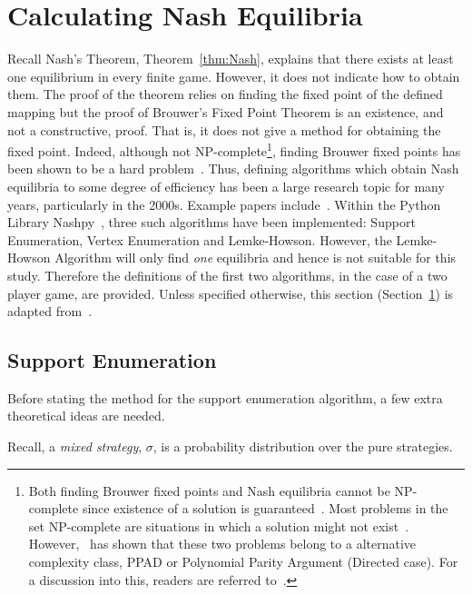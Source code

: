 \section{Calculating Nash Equilibria}\label{sec:Calculating_Nash_Equilibria}
Recall Nash's Theorem, Theorem~\ref{thm:Nash},
explains that there exists at least one equilibrium in every finite game.
However, it does not indicate how to obtain them. The proof of the theorem
relies on finding the fixed point of the defined mapping but the proof of
Brouwer's Fixed Point Theorem is an existence, and not a constructive, proof.
That is, it does not give a method for obtaining the fixed point. Indeed,
although not NP-complete\footnote{Both finding Brouwer fixed points and Nash
equilibria cannot be NP-complete since existence of a solution is
guaranteed~\cite{NoamNisan2007}. Most problems in the set NP-complete are situations in which
a solution might not exist~\cite{NoamNisan2007}. However,~\cite{papadimitriou1994complexity} has shown that these two
problems belong to a alternative complexity class, PPAD or Polynomial Parity
Argument (Directed case). For a discussion into this, readers are referred to~\cite{papadimitriou1994complexity}.}, finding Brouwer fixed points has been shown to be a 
hard problem~\cite{Hirsch1989,papadimitriou1994complexity}. Thus, defining algorithms which obtain Nash equilibria to
some degree of efficiency has been a large research topic for many years,
particularly in the 2000s. Example papers include~\cite{Bossea,Chen2006,Gilpina,Govindan2003,Kontogiannis2006,Krawczyk2000,Littman2005}. Within the Python Library Nashpy~\cite{axelrodproject}, three
such algorithms have been
implemented: Support Enumeration, Vertex Enumeration and Lemke-Howson. However,
the Lemke-Howson Algorithm will only find \textit{one} equilibria and hence is not
suitable for this study. Therefore the definitions of the first two algorithms,
in the case of a two player game, are provided. Unless specified otherwise, this
section (Section~\ref{sec:Calculating_Nash_Equilibria}) is adapted from~\cite{NoamNisan2007}.


\subsection{Support Enumeration}\label{subsec:Support_Enumeration}
Before stating the method for the support enumeration algorithm, a few extra
theoretical ideas are needed. 

Recall, a \textit{mixed strategy}, \(\sigma \), is a probability distribution
over the pure strategies.

